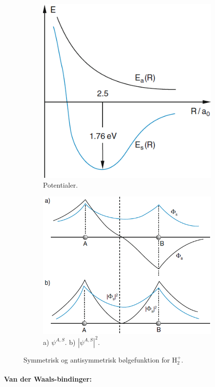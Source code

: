 \begin{figure}[!h]
    \centering
    \begin{subfigure}[t]{0.40\textwidth}
        \centering
        \includegraphics[width=.9\columnwidth]{Q19/images/PotentialCurvesForSymmetricAndAssymetricWaveFunctionH2.PNG}
        \caption{Potentialer.}
        \label{fig:Q19_PotentialCurvesForSymmetricAndAntisymmetricWaveFunctionH2}
    \end{subfigure}
    \hfill
    \begin{subfigure}[t]{0.45\textwidth}
        \centering
        \includegraphics[width=\columnwidth]{Q19/images/SymmetriskOgAntisymmetriskBoelgefunktionForH2.PNG}
        \caption{a) $\psi^{A,S}$. b) $|\psi^{A,S}|^2$.}
        \label{fig:Q19_SymmetricAndAntisymmetricWaveFunctionsAndTheirProbability}
    \end{subfigure}
    \caption{Symmetrisk og antisymmetrisk bølgefunktion for $\text{H}_2^+$.}
    \label{fig:Q19_SymmetricAndAntisymmetricWaveFunctionsOfH2PlusIon}
\end{figure}


\paragraph{Van der Waals-bindinger:}
